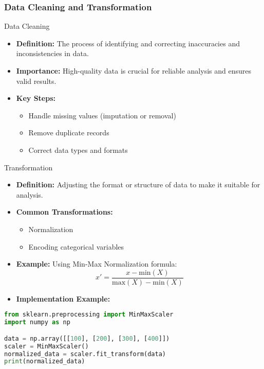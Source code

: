 \documentclass[aspectratio=169]{beamer}
\begin{document}
\begin{frame}
  \frametitle{Data Cleaning and Transformation}
  \begin{block}{Data Cleaning}
    \begin{itemize}
      \item \textbf{Definition:} The process of identifying and correcting inaccuracies and inconsistencies in data.
      \item \textbf{Importance:} High-quality data is crucial for reliable analysis and ensures valid results.
      \item \textbf{Key Steps:}
        \begin{itemize}
          \item Handle missing values (imputation or removal)
          \item Remove duplicate records
          \item Correct data types and formats
        \end{itemize}
    \end{itemize}
  \end{block}

  \begin{block}{Transformation}
    \begin{itemize}
      \item \textbf{Definition:} Adjusting the format or structure of data to make it suitable for analysis.
      \item \textbf{Common Transformations:}
        \begin{itemize}
          \item Normalization
          \item Encoding categorical variables
        \end{itemize}
      \item \textbf{Example:} Using Min-Max Normalization formula:
        \begin{equation}
        x' = \frac{x - \text{min}(X)}{\text{max}(X) - \text{min}(X)}
        \end{equation}
      \item \textbf{Implementation Example:}
    \end{itemize}
    
    \begin{lstlisting}[language=Python]
from sklearn.preprocessing import MinMaxScaler
import numpy as np

data = np.array([[100], [200], [300], [400]])
scaler = MinMaxScaler()
normalized_data = scaler.fit_transform(data)
print(normalized_data)
    \end{lstlisting}
  \end{block}
\end{frame}
\end{document}
